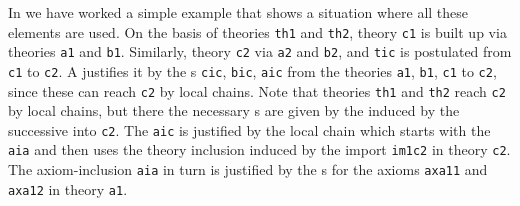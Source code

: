 In {} we have worked a simple example that shows a situation
where all these elements are used. On the basis of theories {\tt{th1}} and
{\tt{th2}}, theory {\tt{c1}} is built up via theories {\tt{a1}} and {\tt{b1}}. Similarly,
theory {\tt{c2}} via {\tt{a2}} and {\tt{b2}}, and {}
{\tt{tic}} is postulated from {\tt{c1}} to {\tt{c2}}. A {}
justifies it by the {s} {\tt{cic}}, {\tt{bic}},
{\tt{aic}} from the theories {\tt{a1}}, {\tt{b1}}, {\tt{c1}} to {\tt{c2}}, since
these can reach {\tt{c2}} by local chains. Note that theories {\tt{th1}} and
{\tt{th2}} reach {\tt{c2}} by local chains, but there the necessary
{s} are given by the {}
induced by the successive {} into {\tt{c2}}. The
{} {\tt{aic}} is justified by the local chain which
starts with the {} {\tt{aia}} and then uses the
theory inclusion induced by the import {\tt{im1c2}} in theory {\tt{c2}}. The
axiom-inclusion {\tt{aia}} in turn is justified by the {s} for the axioms {\tt{axa11}} and {\tt{axa12}} in
theory {\tt{a1}}. 

